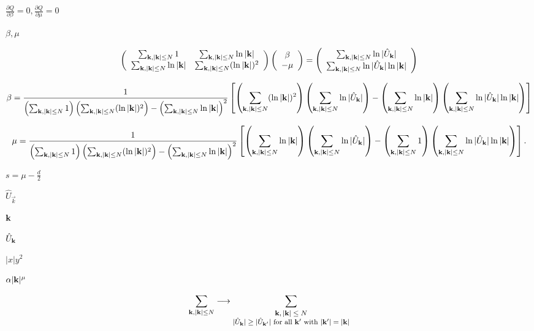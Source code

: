 \documentclass{article}
\begin{document}
$\frac{\partial Q}{\partial\beta}=0, \frac{\partial Q}{\partial\mu}=0$
\pagebreak

$\beta,\mu$
\pagebreak

\[ \left(\begin{array}{cc} \sum_{{\bf k}, |{\bf k}|\le N} 1 & \sum_{{\bf k}, |{\bf k}|\le N} \ln |{\bf k}| \\ \sum_{{\bf k}, |{\bf k}|\le N} \ln |{\bf k}| & \sum_{{\bf k}, |{\bf k}|\le N} (\ln |{\bf k}|)^2 \end{array}\right) \left(\begin{array}{c} \beta \\ -\mu \end{array}\right) = \left(\begin{array}{c} \sum_{{\bf k}, |{\bf k}|\le N} \ln |\hat U_{{\bf k}}| \\ \sum_{{\bf k}, |{\bf k}|\le N} \ln |\hat U_{{\bf k}}| \ln |{\bf k}| \end{array}\right) \]
\pagebreak

\[ \beta = \frac 1{\left(\sum_{{\bf k}, |{\bf k}|\le N} 1\right) \left(\sum_{{\bf k}, |{\bf k}|\le N} (\ln |{\bf k}|)^2\right) -\left(\sum_{{\bf k}, |{\bf k}|\le N} \ln |{\bf k}|\right)^2} \left[ \left(\sum_{{\bf k}, |{\bf k}|\le N} (\ln |{\bf k}|)^2\right) \left(\sum_{{\bf k}, |{\bf k}|\le N} \ln |\hat U_{{\bf k}}|\right) - \left(\sum_{{\bf k}, |{\bf k}|\le N} \ln |{\bf k}|\right) \left(\sum_{{\bf k}, |{\bf k}|\le N} \ln |\hat U_{{\bf k}}| \ln |{\bf k}| \right) \right] \]
\pagebreak

\[ \mu = \frac 1{\left(\sum_{{\bf k}, |{\bf k}|\le N} 1\right) \left(\sum_{{\bf k}, |{\bf k}|\le N} (\ln |{\bf k}|)^2\right) -\left(\sum_{{\bf k}, |{\bf k}|\le N} \ln |{\bf k}|\right)^2} \left[ \left(\sum_{{\bf k}, |{\bf k}|\le N} \ln |{\bf k}|\right) \left(\sum_{{\bf k}, |{\bf k}|\le N} \ln |\hat U_{{\bf k}}|\right) - \left(\sum_{{\bf k}, |{\bf k}|\le N} 1\right) \left(\sum_{{\bf k}, |{\bf k}|\le N} \ln |\hat U_{{\bf k}}| \ln |{\bf k}| \right) \right]. \]
\pagebreak

$s=\mu-\frac d2$
\pagebreak

$\hat U_{\vec k}$
\pagebreak

${\bf k}$
\pagebreak

$\hat U_{{\bf k}}$
\pagebreak

$|x|y^2$
\pagebreak

$\alpha |{\bf k}|^\mu$
\pagebreak

\[ \sum_{{\bf k}, |{\bf k}|\le N} \longrightarrow \sum_{\footnotesize \begin{matrix}{{\bf k}, |{\bf k}|\le N} \\ {|\hat U_{{\bf k}}| \ge |\hat U_{{\bf k}'}| \ \textrm{for all}\ {\bf k}'\ \textrm{with}\ |{\bf k}'|=|{\bf k}|}\end{matrix}} \]
\pagebreak
\end{document}
